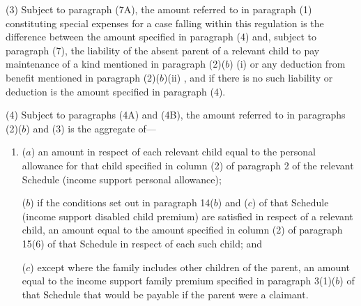 \documentclass[12pt,a4paper]{article}
\begin{document}
(3) 
Subject to paragraph (7A),  %
the amount referred to in paragraph (1) constituting special expenses for a case falling within this regulation is the difference between the amount specified in paragraph (4) and, subject to paragraph (7), the liability of the absent parent of a relevant child to pay maintenance of a kind mentioned in paragraph (2)($b$)%
(i) or any deduction from benefit mentioned in paragraph (2)($b$)(ii)%
, and if there is no such liability 
or deduction  %
is the amount specified in paragraph (4).

(4) 
Subject to paragraphs (4A) and (4B),  %
the amount referred to in paragraphs (2)($b$) and (3) is the aggregate of—
\begin{enumerate}\item[]
($a$) an amount in respect of each relevant child equal to the personal allowance
for that child specified in column (2) of paragraph 2 of the relevant Schedule
(income support personal allowance);

($b$) if the conditions set out in paragraph 14($b$) and ($c$) 
of  %
that Schedule (income support disabled child premium) are satisfied in respect of a relevant child, an amount equal to the amount specified in column (2) of paragraph 15(6) of that Schedule in respect of each such child;
and  %


%

($c$) except where the family includes other children of the parent, an amount equal to the income support family premium specified in paragraph 3(1)($b$) of that Schedule that would be payable if the parent were a claimant.


\end{enumerate}
\end{document}

